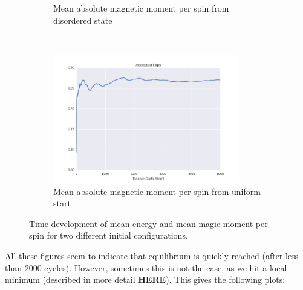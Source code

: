 \documentclass[a4paper, 10pt]{article}
\begin{document}
\begin{figure}[!ht]
\begin{subfigure}[H!]{0.5\textwidth}
        \caption{Mean absolute magnetic moment per spin from disordered state}
    \end{subfigure}%
    ~ 
    \begin{subfigure}[H!]{0.5\textwidth}
        \centering
        \includegraphics[height=2.2in]{flipsWUpStartT24.png}
        \caption{Mean absolute magnetic moment per spin from uniform start}
    \end{subfigure}
      \caption{Time development of mean energy and mean magic moment per spin for two different initial configurations.}\label{fig:20x20_Sweep_flips}
\end{figure}
All these figures seem to indicate that equilibrium is quickly reached (after less than 2000 cycles). However, sometimes this is not the case, as we hit a local minimum (described in more detail \textbf{HERE}). This gives the following plots:
\end{document}
